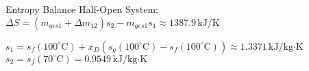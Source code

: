 Entropy Balance Half-Open System:  
\( \Delta S = (m_{ges1} + \Delta m_{12}) s_2 - m_{ges1} s_1 \approx 1387.9 \, \text{kJ/K} \)  

\( s_1 = s_f(100^\circ \text{C}) + x_D (s_g(100^\circ \text{C}) - s_f(100^\circ \text{C})) \approx 1.3371 \, \text{kJ/kg·K} \)  
\( s_2 = s_f(70^\circ \text{C}) = 0.9549 \, \text{kJ/kg·K} \)